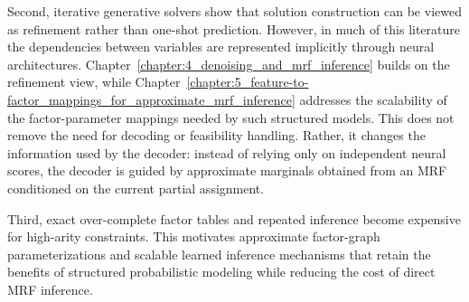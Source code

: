 Second, iterative generative solvers show that solution construction can be viewed as refinement rather than one-shot prediction. However, in much of this literature the dependencies between variables are represented implicitly through neural architectures. Chapter~\ref{chapter:4_denoising_and_mrf_inference} builds on the refinement view, while Chapter~\ref{chapter:5_feature-to-factor_mappings_for_approximate_mrf_inference} addresses the scalability of the factor-parameter mappings needed by such structured models. This does not remove the need for decoding or feasibility handling. Rather, it changes the information used by the decoder: instead of relying only on independent neural scores, the decoder is guided by approximate marginals obtained from an MRF conditioned on the current partial assignment.

Third, exact over-complete factor tables and repeated inference become expensive for high-arity constraints. This motivates approximate factor-graph parameterizations and scalable learned inference mechanisms that retain the benefits of structured probabilistic modeling while reducing the cost of direct MRF inference.
